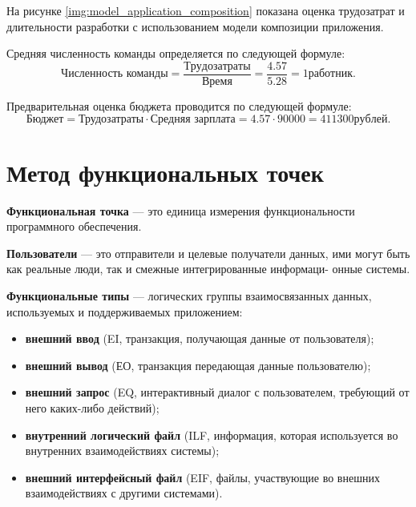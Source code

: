 \documentclass{bmstu}
\begin{document}
На рисунке \ref{img:model_application_composition} показана оценка трудозатрат и длительности разработки с использованием модели композиции приложения.


Средняя численность команды определяется по следующей формуле:
\begin{equation}
    \text{Численность команды} = \frac{Трудозатраты}{Время} = \frac{4.57}{5.28} = 1 работник.
\end{equation}

Предварительная оценка бюджета проводится по следующей формуле:
\begin{equation}
    \text{Бюджет} = \text{Трудозатраты} \cdot \text{Средняя зарплата} = \text{4.57} \cdot \text{90000} = 411300 рублей.
\end{equation}


\clearpage

\section*{Метод функциональных точек}

\textbf{Функциональная точка} --- это единица измерения функциональности программного обеспечения.

\textbf{Пользователи} --- это отправители и целевые получатели данных, ими могут быть как реальные люди, так и смежные интегрированные информаци- онные системы.

\textbf{Функциональные типы} --- логических группы взаимосвязанных данных, используемых и поддерживаемых приложением:

\begin{itemize}
    \item \textbf{внешний ввод} (EI, транзакция, получающая данные от пользователя);
    \item \textbf{внешний вывод} (ЕО, транзакция передающая данные пользователю);
    \item \textbf{внешний запрос} (EQ, интерактивный диалог с пользователем, требующий от него каких-либо действий);
    \item \textbf{внутренний логический файл} (ILF, информация, которая используется во внутренних взаимодействиях системы);
    \item \textbf{внешний интерфейсный файл} (EIF, файлы, участвующие во внешних взаимодействиях с другими системами).
\end{itemize}
\end{document}
